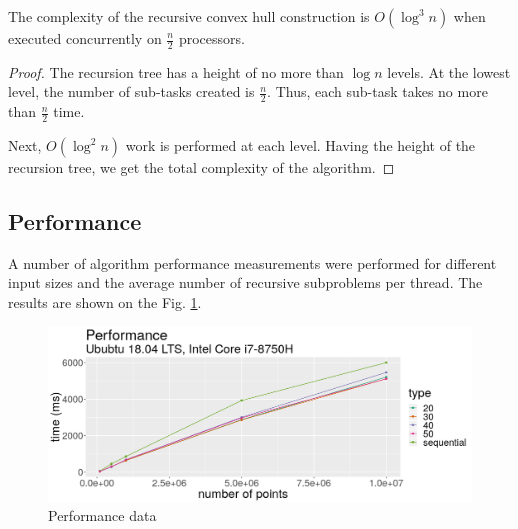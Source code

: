 \documentclass[a4paper,UKenglish,cleveref, autoref]{socg-lipics-v2019}
\begin{document}
	\begin{theorem}
		The complexity of the recursive convex hull construction is $O(\log^3n)$ when executed concurrently on $\frac{n}{2}$ processors.
	\end{theorem}
	
	\begin{proof}
		The recursion tree has a height of no more than $\log n$ levels. At the lowest level, the number of sub-tasks created is $\frac{n}{2}$. Thus, each sub-task takes no more than $\frac{n}{2}$ time.
		
		Next, $O(\log^2 n)$ work is performed at each level. Having the height of the recursion tree, we get the total complexity of the algorithm.
	\end{proof}	




\subsection{Performance}
\label{sec:performance}



	A number of algorithm performance measurements were performed for different input sizes and the average number of recursive subproblems per thread. The results are shown on the Fig. \ref{fig:performance}.
	
	\begin{figure}[h]
		\centering
		\includegraphics[width=1\textwidth, height=0.4\textheight]{performance}
		\caption{Performance data}
		\label{fig:performance}
	\end{figure}
\end{document}
